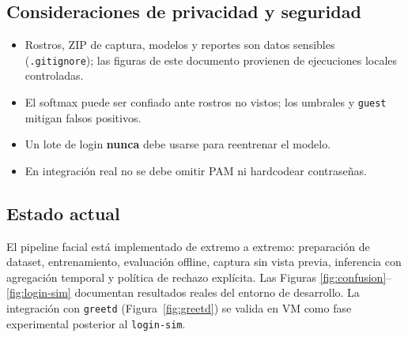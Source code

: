 \subsection{Consideraciones de privacidad y seguridad}
\label{subsec:seguridad}

\begin{itemize}
  \item Rostros, ZIP de captura, modelos y reportes son datos sensibles
        (\texttt{.gitignore}); las figuras de este documento provienen de
        ejecuciones locales controladas.
  \item El softmax puede ser confiado ante rostros no vistos; los umbrales y
        \texttt{guest} mitigan falsos positivos.
  \item Un lote de login \textbf{nunca} debe usarse para reentrenar el modelo.
  \item En integración real no se debe omitir PAM ni hardcodear contraseñas.
\end{itemize}

\subsection{Estado actual}
\label{subsec:estado}

El pipeline facial está implementado de extremo a extremo: preparación de dataset,
entrenamiento, evaluación offline, captura sin vista previa, inferencia con
agregación temporal y política de rechazo explícita. Las Figuras
\ref{fig:confusion}--\ref{fig:login-sim} documentan resultados reales del entorno
de desarrollo. La integración con \texttt{greetd} (Figura~\ref{fig:greetd}) se
valida en VM como fase experimental posterior al \texttt{login-sim}.
